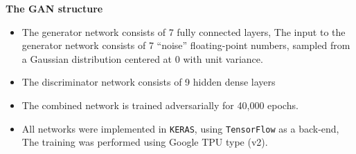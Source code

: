 \begin{frame}{\underline{\secname}}

\begin{center}
\textbf{The GAN structure}
\end{center}
\begin{itemize}			
\item

The generator network consists of 7 fully connected layers, The input to the generator network consists of 7 ``noise'' floating-point numbers, sampled from a Gaussian distribution centered at 0 with unit variance.


\item

The discriminator network consists of 9 hidden dense layers %

\item

The combined network is trained adversarially for 40,000 epochs.

\item

All networks were implemented in {\tt KERAS}, using {\tt TensorFlow} as a back-end, The training was performed using Google TPU type (v2).

\end{itemize}

\end{frame}


